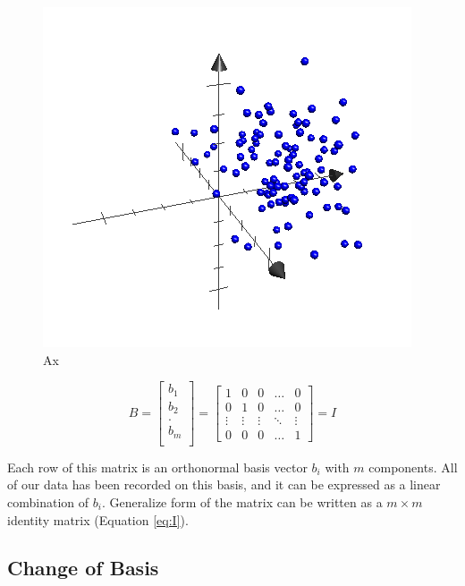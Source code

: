 \begin{figure}[!h]
\begin{center}
        \includegraphics[width=0.4\textheight]{img/3D.png}
        \caption{Ax}  \label{plot:3d}
\end{center}
\end{figure}

\begin{equation}
%
    B =
	\begin{bmatrix}
    		b_{1}  \\
		b_{2}  \\
    		. \\
		b_{m}  \\
	\end{bmatrix}
	=
	\begin{bmatrix}
    		1 & 0 & 0 & \dots  & 0 \\
   		 0 & 1 & 0 & \dots  & 0 \\
    		\vdots & \vdots & \vdots & \ddots & \vdots \\
    		0 & 0 & 0 & \dots  &1
	\end{bmatrix}
	= I
%
\label{eq:I}
\end{equation}

Each row of this matrix is an orthonormal basis vector $b_{i}$ with $m$ components. All of our data has been recorded on this basis, and it can be expressed as a linear combination of ${b_{i}}$. Generalize form of the matrix can be written as a $m\times m$ identity matrix (Equation \ref{eq:I}).

\subsection{Change of Basis}

